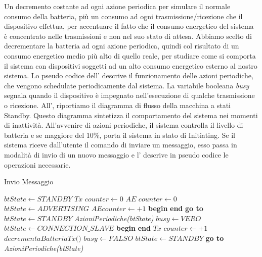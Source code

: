 Un decremento costante ad ogni azione periodica per simulare il normale consumo della batteria, più un consumo ad ogni trasmissione/ricezione che il dispositivo effettua, per accentuare il fatto che il consumo energetico del sistema è concentrato nelle trasmissioni e non nel suo stato di attesa. Abbiamo scelto di decrementare la batteria ad ogni azione periodica, quindi col risultato di un consumo energetico medio più alto di quello reale, per studiare come si comporta il sistema con dispositivi soggetti ad un alto consumo energetico esterno al nostro sistema. Lo pseudo codice dell' descrive il funzionamento delle azioni periodiche, che vengono schedulate periodicamente dal sistema. La variabile booleana \textit{busy} segnala quando il dispositivo è impegnato nell'esecuzione di qualche trasmissione o ricezione. All', riportiamo il diagramma di flusso della macchina a stati Standby. Questo diagramma sintetizza il comportamento del sistema nei momenti di inattività. All'avvenire di azioni periodiche, il sistema controlla il livello di batteria e se maggiore del 10\%, porta il sistema in stato di Initiating. Se il sistema riceve dall'utente il comando di inviare un messaggio, esso passa in modalità di invio di un nuovo messaggio e l' descrive in pseudo codice le operazioni necessarie.

\begin{algorithm}[ph]
	\caption{Invio Messaggio}\label{alg:invia_msg}
	\begin{algorithmic}[1]
				\State $ \textit{btState} \gets STANDBY$
			\EndIf
		\State $ \textit{Tx counter} \gets 0 $ 
		\Label {}
		\State $ \textit{AE counter} \gets 0 $ 
		\State $ \textit{btState} \gets ADVERTISING$
		\State $ AE counter \gets +1 $
		\State \textbf{begin}
			\State\hspace{\algorithmicindent}{ADVERTISING EVENT}
		\State \textbf{end}
				\State \textbf{go to} 
			\Else
				\State $btState \gets STANDBY$
				\State \textit{AzioniPeriodiche(btState)}
			\EndIf
		\EndIf
		\State $ \textit{busy}\gets VERO $
		\State $\textit{btState}\gets CONNECTION\_SLAVE$
		\State \textbf{begin}
			\State\hspace{\algorithmicindent}{CONNECTION EVENT}
		\State \textbf{end}
		\State $\textit{Tx counter}\gets +1$
		\State $ \textit{decrementaBatteriaTx()}$
		\State $\textit{busy}\gets FALSO$
		\State $ \textit{btState}\gets STANDBY $
			\State \textbf{go to} 
		\Else
			\State \textit{AzioniPeriodiche(btState)}
		\EndIf
		\EndFunction
	\end{algorithmic}
\end{algorithm}

